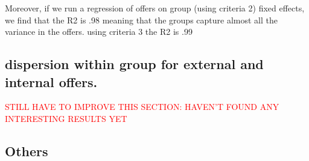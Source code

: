 \documentclass[12pt]{article}
\begin{document}


Moreover, if we run a regression of offers on group (using criteria 2) fixed effects, we find that the R2 is .98 meaning that the groups capture almost all the variance in the offers. using criteria 3 the R2 is .99 



\subsection{dispersion within group for external and internal offers. }


\textcolor{red}{STILL HAVE TO IMPROVE THIS SECTION: HAVEN'T FOUND ANY INTERESTING RESULTS YET}

\subsection{Others}
\end{document}

